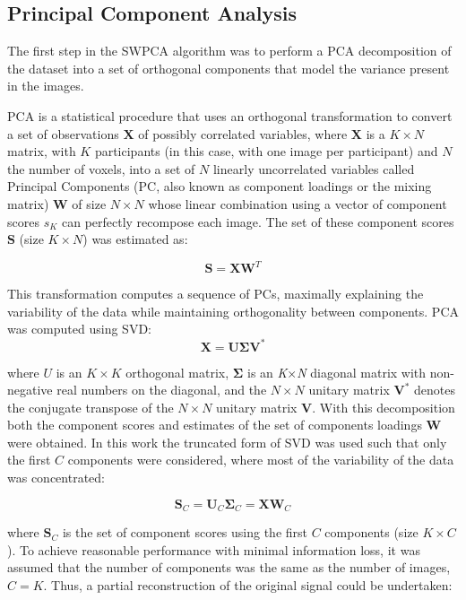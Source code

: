 \subsection{Principal Component Analysis}\label{sec:pca}
The first step in the \ac{SWPCA} algorithm was to perform a \ac{PCA} decomposition
of the dataset into a set of orthogonal components that model the
variance present in the images. 

\ac{PCA} is a statistical procedure that uses an orthogonal transformation to convert a set of observations $\mathbf{X}$ of possibly correlated variables, where $\mathbf{X}$ is a $K\times N$ matrix, with $K$ participants (in this case, with one image per participant) and $N$ the number of voxels, into a set of $N$ linearly uncorrelated variables called Principal Components (PC, also known as component loadings or the mixing matrix)  $\mathbf{W}$ of size $N\times N$ whose linear combination using a vector of component scores  ${s}_{K}$ can perfectly recompose each image. The set of these component scores  $\mathbf{S}$ (size $K \times N$) was estimated as:

\begin{equation}
	\mathbf{S}=\mathbf{X}\mathbf{W}^T
\end{equation}

This transformation computes a sequence of PCs, maximally explaining the
variability of the data while maintaining orthogonality between
components. \ac{PCA} was computed using \acf{SVD}:
\begin{equation}
	\mathbf{X} = \mathbf{U}\boldsymbol{\Sigma}\mathbf{V}^*
\end{equation}

where  $U$ is an $K\times K$ orthogonal matrix,  $\boldsymbol\Sigma$ is an \textit{K}×\textit{N} diagonal matrix with non-negative real numbers on the diagonal, and the $N\times N$ unitary matrix  $\mathbf{V}^*$ denotes the conjugate transpose of the $N\times N$ unitary matrix  $\mathbf{V}$. With this decomposition both the component scores and estimates of the set of components loadings  $\mathbf{W}$ were obtained. In this work the truncated form of \ac{SVD} was used such that only the first $C$ components were considered, where most of the variability of the data was concentrated:

\begin{equation}
	\mathbf{S}_C = \mathbf{U}_C \boldsymbol{\Sigma}_C = \mathbf{X}\mathbf{W}_C
\end{equation}

where  $\mathbf{S}_C$ is the set of component scores using the first $C$ components (size $K\times C$). To achieve reasonable performance with minimal information loss, it was assumed that the number of components was the same as the number of images, $C=K$. Thus, a partial reconstruction of the original signal could be undertaken:

